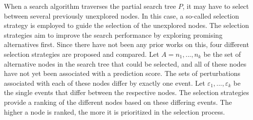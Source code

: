 When a search algorithm traverses the partial search tree $P$, it may have to select between several previously unexplored nodes. In this case, a so-called selection strategy is employed to guide the selection of the unexplored nodes. 
The selection strategies aim to improve the search performance by exploring promising alternatives first. Since there have not been any prior works on this, four different selection strategies are proposed and compared. Let $A = {n_1,...,n_k}$ be the set of alternative nodes in the search tree that could be selected, and all of these nodes have not yet been associated with a prediction score. The sets of perturbations associated with each of these nodes differ by exactly one event. Let $\varepsilon_1, ..., \varepsilon_k$ be the single events that differ between the respective nodes. The selection strategies provide a ranking of the different nodes based on these differing events. The higher a node is ranked, the more it is prioritized in the selection process.

